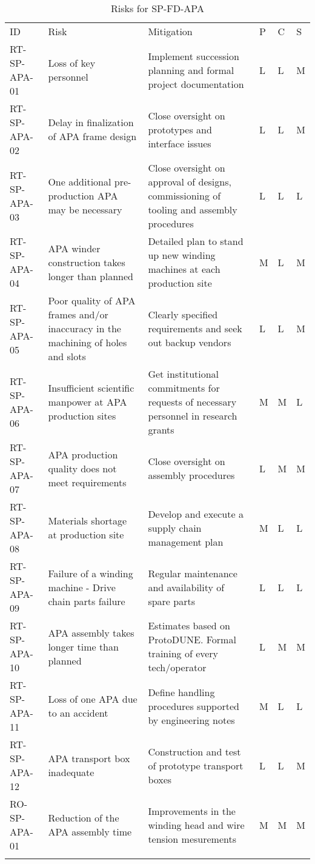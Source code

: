 
\begin{longtable}{p{}p{}p{}p{}p{}p{}} 
\caption{Risks for SP-FD-APA } \\
\rowcolor{dunesky}
ID & Risk & Mitigation & P & C & S  \\  \colhline
RT-SP-APA-01 & Loss of key personnel & Implement succession planning and formal project documentation & L & L & M \\  \colhline
RT-SP-APA-02 & Delay in finalization of APA frame design & Close oversight on prototypes and interface issues & L & L & M \\  \colhline
RT-SP-APA-03 & One additional pre-production APA may be necessary & Close oversight on approval of designs, commissioning of tooling and assembly procedures & L & L & L \\  \colhline
RT-SP-APA-04 & APA winder construction takes longer than planned & Detailed plan to stand up new winding machines at each production site & M & L & M \\  \colhline
RT-SP-APA-05 & Poor quality of APA frames and/or inaccuracy in the machining of holes and slots & Clearly specified requirements and seek out backup vendors & L & L & M \\  \colhline
RT-SP-APA-06 & Insufficient scientific manpower at APA production sites & Get institutional commitments for requests of necessary personnel in research grants & M & M & L \\  \colhline
RT-SP-APA-07 & APA production quality does not meet requirements & Close oversight on assembly procedures & L & M & M \\  \colhline
RT-SP-APA-08 & Materials shortage at production site & Develop and execute a supply chain management plan & M & L & L \\  \colhline
RT-SP-APA-09 & Failure of a winding machine - Drive chain parts failure & Regular maintenance and availability of spare parts & L & L & L \\  \colhline
RT-SP-APA-10 & APA assembly takes longer time than planned  & Estimates based on ProtoDUNE. Formal training of every tech/operator & L & M & M \\  \colhline
RT-SP-APA-11 & Loss of one APA due to an accident & Define handling procedures supported by engineering notes & M & L & L \\  \colhline
RT-SP-APA-12 & APA transport box inadequate & Construction and test of prototype transport boxes & L & L & M \\  \colhline
RO-SP-APA-01 & Reduction of the APA assembly time & Improvements in the winding head and wire tension mesurements & M & M & M \\  \colhline

\label{tab:risks:SP-FD-APA}
\end{longtable}